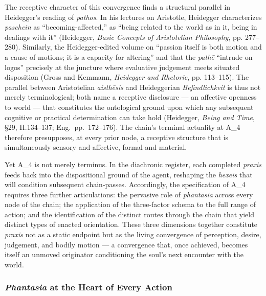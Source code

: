 \documentclass{article}
\begin{document}
The receptive character of this convergence finds a structural parallel in Heidegger's reading of \textit{pathos}. In his lectures on Aristotle, Heidegger characterizes \textit{paschein} as ``becoming-affected,'' as ``being related to the world as in it, being in dealings with it'' (Heidegger, \textit{Basic Concepts of Aristotelian Philosophy}, pp. 277--280). Similarly, the Heidegger-edited volume on ``passion itself is both motion and a cause of motions; it is a capacity for altering'' and that the \textit{path\={e}} ``intrude on logos'' precisely at the juncture where evaluative judgement meets situated disposition (Gross and Kemmann, \textit{Heidegger and Rhetoric}, pp. 113--115). The parallel between Aristotelian \textit{aisth\={e}sis} and Heideggerian \textit{Befindlichkeit} is thus not merely terminological; both name a receptive disclosure --- an affective openness to world --- that constitutes the ontological ground upon which any subsequent cognitive or practical determination can take hold (Heidegger, \textit{Being and Time}, \S29, H.134--137; Eng.~pp.~172--176). The chain's terminal actuality at A\_4 therefore presupposes, at every prior node, a receptive structure that is simultaneously sensory and affective, formal and material.

Yet A\_4 is not merely terminus. In the diachronic register, each completed \textit{praxis} feeds back into the dispositional ground of the agent, reshaping the \textit{hexeis} that will condition subsequent chain-passes. Accordingly, the specification of A\_4 requires three further articulations: the pervasive role of \textit{phantasia} across every node of the chain; the application of the three-factor schema to the full range of action; and the identification of the distinct routes through the chain that yield distinct types of enacted orientation. These three dimensions together constitute \textit{praxis} not as a static endpoint but as the living convergence of perception, desire, judgement, and bodily motion --- a convergence that, once achieved, becomes itself an unmoved originator conditioning the soul's next encounter with the world.


\subsubsection*{\textit{Phantasia} at the Heart of Every Action}
\end{document}
